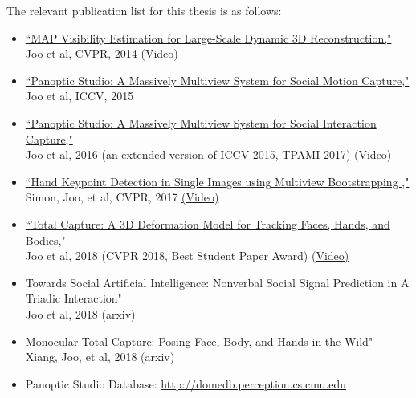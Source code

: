 The relevant publication list for this thesis is as follows: 
\begin{itemize}
	\item  \noindent \href{http://www.cs.cmu.edu/~hanbyulj/14/CVPR_2014_Visibility.pdf}{``MAP Visibility Estimation for Large-Scale Dynamic 3D Reconstruction,"}\\ 
	Joo et al, CVPR, 2014 \href{https://www.youtube.com/watch?v=LaHTjBWago8}{(Video)}
	
	\item \noindent \href{http://www.cs.cmu.edu/~hanbyulj/panoptic-studio/ICCV2015_SMC.pdf}{``Panoptic Studio: A Massively Multiview System for Social Motion Capture,"}\\ 
	Joo et al, ICCV, 2015 
	
	\item \noindent \href{https://ieeexplore.ieee.org/document/8187699}{``Panoptic Studio: A Massively Multiview System for Social Interaction Capture,"}\\ 
	Joo et al, 2016 (an extended version of ICCV 2015, TPAMI 2017) \href{https://www.youtube.com/watch?v=m0-7HnWvxG4}{(Video)}
	
	\item \noindent \href{https://arxiv.org/abs/1704.07809}{``Hand Keypoint Detection in Single Images using Multiview Bootstrapping ,"}\\ 
	Simon, Joo, et al, CVPR, 2017 \href{https://www.youtube.com/watch?v=Lajt6vS_dSM}{(Video)}	
	
	\item \noindent \href{http://openaccess.thecvf.com/content_cvpr_2018/papers/Joo_Total_Capture_A_CVPR_2018_paper.pdf}{``Total Capture: A 3D Deformation Model for Tracking Faces, Hands, and Bodies,"}\\ 
	Joo et al, 2018 (CVPR 2018, Best Student Paper Award) \href{https://www.youtube.com/watch?v=5QzdXQSf-oY}{(Video)}	
	
	\item \noindent 
	{Towards Social Artificial Intelligence: Nonverbal Social Signal Prediction in A Triadic Interaction"}\\ 
	Joo et al, 2018 (arxiv)
		
	\item \noindent 
	{Monocular Total Capture: Posing Face, Body, and Hands in the Wild"}\\ 
	Xiang, Joo, et al, 2018 (arxiv)
	
	\item \noindent Panoptic Studio Database: \url{http://domedb.perception.cs.cmu.edu}
	
	
\end{itemize}

